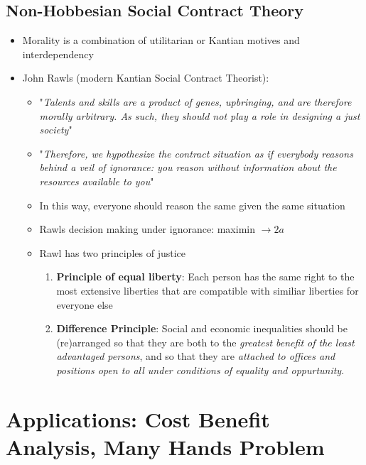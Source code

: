 \documentclass{article}
\begin{document}
        \subsection{Non-Hobbesian Social Contract Theory}
        \begin{itemize}
            \item Morality is a combination of utilitarian or Kantian motives and interdependency
            \item John Rawls (modern Kantian Social Contract Theorist):
                \begin{itemize}
                    \item "\textit{Talents and skills are a product of genes, upbringing, and are therefore morally arbitrary. As such, they should not play a role in designing a just society}"
                    \item "\textit{Therefore, we hypothesize the contract situation as if everybody reasons behind a veil of ignorance: you reason without information about the resources available to you}"
                    \item In this way, everyone should reason the same given the same situation
                    \item Rawls decision making under ignorance: maximin $\longrightarrow 2a$
                    \item Rawl has two principles of justice
                        \begin{enumerate}
                            \item \textbf{Principle of equal liberty}: Each person has the same right to the most extensive liberties that are compatible with similiar liberties for everyone else
                            \item \textbf{Difference Principle}: Social and economic inequalities should be (re)arranged so that they are both to the \textit{greatest benefit of the least advantaged persons}, and so that they are \textit{attached to offices and positions open to all under conditions of equality and oppurtunity}.
                        \end{enumerate}
                \end{itemize}
        \end{itemize}
 \section{Applications: Cost Benefit Analysis, Many Hands Problem}
\end{document}
